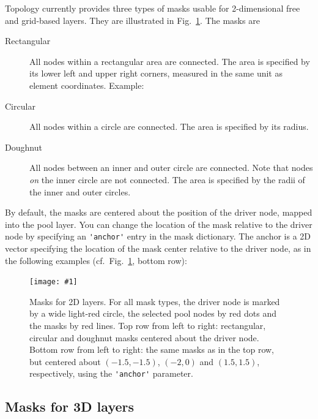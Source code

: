 \documentclass[a4paper,12pt]{report}
\newcommand{\scriptfig}[4]{%
\begin{figure}
\centerline{\texttt{[image: \#1]}}
\caption[#3]{#4}
\label{fig:#1}
\end{figure}%
}
\begin{document}
Topology currently provides three types of masks usable for 2-dimensional
free and grid-based layers. They are illustrated in Fig.~\ref{fig:conn2}.
The masks are
\begin{description}
\item[Rectangular] All nodes within a rectangular
  area are connected. The area is specified by its lower left and
  upper right corners, measured in the same unit as element
  coordinates. Example:

\item[Circular] All nodes within a circle are
  connected.  The area is specified by its radius.

\item[Doughnut] All nodes between an inner and outer
  circle are connected. Note that nodes \emph{on} the inner circle are
  not connected. The area is specified by the radii of the inner and
  outer circles.

\end{description}
By default, the masks are centered about the position of the driver
node, mapped into the pool layer. You can change the location of the
mask relative to the driver node by specifying an
\lstinline!'anchor'! entry in the mask dictionary. The
anchor is a 2D vector specifying the location of the mask center
relative to the driver node, as in the following examples (cf.\
Fig.~\ref{fig:conn2}, bottom row):




\scriptfig{conn2}{0.9}{Masks for 2D layers}%
{Masks for 2D layers. For all mask types, the driver node is
  marked by a wide light-red circle, the selected pool nodes by red
  dots and the masks by red lines. Top row from left to right:
  rectangular, circular and doughnut masks centered about the driver
  node.
Bottom row from left to right: the same masks as in the top row, but
centered about $(-1.5,-1.5)$, $(-2,0)$ and $(1.5,1.5)$, respectively,
using the \lstinline!'anchor'! parameter.}


\subsection{Masks for 3D layers}\label{sec:3d_masks}
\end{document}
